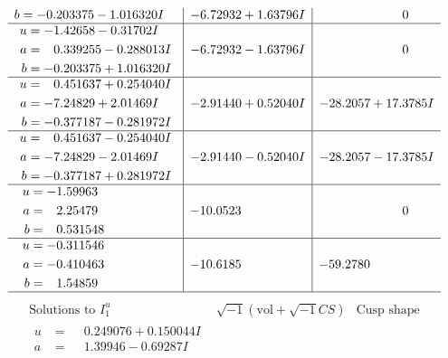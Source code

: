 \documentclass[1p]{elsarticle_modified}
\theoremstyle{definition}
\newcommand{\I}{\sqrt{-1}}
\begin{document}
$$\begin{array}{c|c|c}
\begin{aligned}
b &= -0.203375 - 1.016320 I\end{aligned}
 & -6.72932 + 1.63796 I & \phantom{-0.000000 } 0 \\ \hline\begin{aligned}
u &= -1.42658 - 0.31702 I \\
a &= \phantom{-}0.339255 - 0.288013 I \\
b &= -0.203375 + 1.016320 I\end{aligned}
 & -6.72932 - 1.63796 I & \phantom{-0.000000 } 0 \\ \hline\begin{aligned}
u &= \phantom{-}0.451637 + 0.254040 I \\
a &= -7.24829 + 2.01469 I \\
b &= -0.377187 - 0.281972 I\end{aligned}
 & -2.91440 + 0.52040 I & -28.2057 + 17.3785 I \\ \hline\begin{aligned}
u &= \phantom{-}0.451637 - 0.254040 I \\
a &= -7.24829 - 2.01469 I \\
b &= -0.377187 + 0.281972 I\end{aligned}
 & -2.91440 - 0.52040 I & -28.2057 - 17.3785 I \\ \hline\begin{aligned}
u &= -1.59963\phantom{ +0.000000I} \\
a &= \phantom{-}2.25479\phantom{ +0.000000I} \\
b &= \phantom{-}0.531548\phantom{ +0.000000I}\end{aligned}
 & -10.0523\phantom{ +0.000000I} & \phantom{-0.000000 } 0 \\ \hline\begin{aligned}
u &= -0.311546\phantom{ +0.000000I} \\
a &= -0.410463\phantom{ +0.000000I} \\
b &= \phantom{-}1.54859\phantom{ +0.000000I}\end{aligned}
 & -10.6185\phantom{ +0.000000I} & -59.2780\phantom{ +0.000000I}\\
 \hline 
 \end{array}$$\newpage$$\begin{array}{c|c|c}  
\text{Solutions to }I^u_{1}& \I (\text{vol} + \sqrt{-1}CS) & \text{Cusp shape}\\
 \hline 
\begin{aligned}
u &= \phantom{-}0.249076 + 0.150044 I \\
a &= \phantom{-}1.39946 - 0.69287 I \\

\end{aligned}
\end{array}$$
\end{document}
